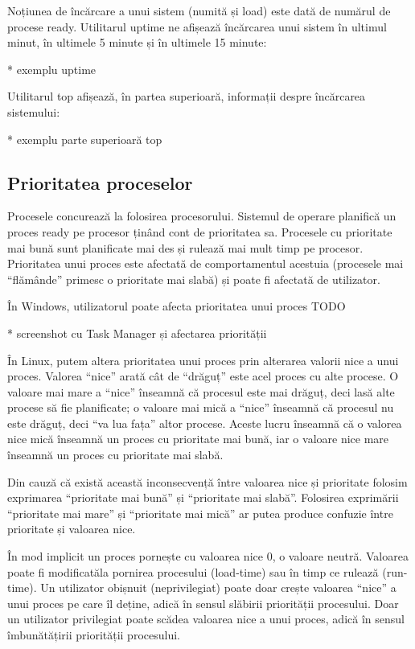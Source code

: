 Noțiunea de încărcare a unui sistem (numită și load) este dată de numărul de
procese ready. Utilitarul uptime ne afișează încărcarea unui sistem în ultimul
minut, în ultimele 5 minute și în ultimele 15 minute:

* exemplu uptime

Utilitarul top afișează, în partea superioară, informații despre încărcarea
sistemului:

* exemplu parte superioară top

\subsection{Prioritatea proceselor}
\label{sec:procese-resurse-prioritate}

Procesele concurează la folosirea procesorului. Sistemul de operare planifică un
proces ready pe procesor ținând cont de prioritatea sa. Procesele cu prioritate
mai bună sunt planificate mai des și rulează mai mult timp pe procesor.
Prioritatea unui proces este afectată de comportamentul acestuia (procesele mai
“flămânde” primesc o prioritate mai slabă) și poate fi afectată de utilizator.

În Windows, utilizatorul poate afecta prioritatea unui proces TODO

* screenshot cu Task Manager și afectarea priorității

În Linux, putem altera prioritatea unui proces prin alterarea valorii nice a
unui proces. Valorea “nice” arată cât de “drăguț” este acel proces cu alte
procese. O valoare mai mare a “nice” înseamnă că procesul este mai drăguț, deci
lasă alte procese să fie planificate; o valoare mai mică a “nice” înseamnă că
procesul nu este drăguț, deci “va lua fața” altor procese. Aceste lucru înseamnă
că o valorea nice mică înseamnă un proces cu prioritate mai bună, iar o valoare
nice mare înseamnă un proces cu prioritate mai slabă.

\begin{note}[NOTĂ]

Din cauză că există această inconsecvență între valoarea nice și prioritate
folosim exprimarea “prioritate mai bună” și “prioritate mai slabă”.
Folosirea exprimării “prioritate mai mare” și “prioritate mai mică” ar
putea produce confuzie între prioritate și valoarea nice.

\end{note}

În mod implicit un proces pornește cu valoarea nice 0, o valoare neutră.
Valoarea poate fi modificatăla pornirea procesului (load-time) sau în timp ce
rulează (run-time). Un utilizator obișnuit (neprivilegiat) poate doar crește
valoarea “nice” a unui proces pe care îl deține, adică în sensul slăbirii
priorității procesului. Doar un utilizator privilegiat poate scădea valoarea
nice a unui proces, adică în sensul îmbunătățirii priorității procesului.

